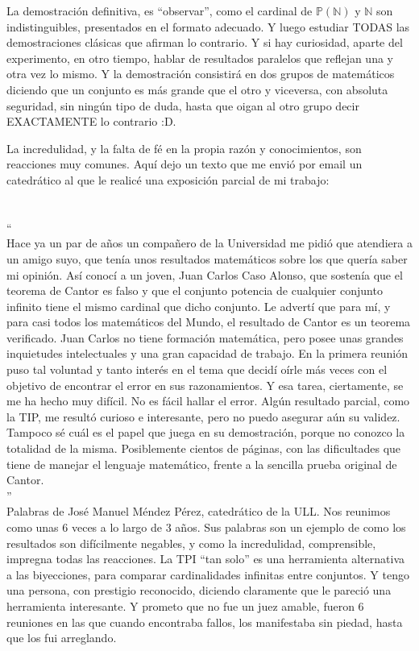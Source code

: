 \noindent
La demostración definitiva, es ``observar'', como el cardinal de $\mathbb{P(N)}$ y $\mathbb{N}$ son indistinguibles, presentados en el formato adecuado. Y luego estudiar TODAS las demostraciones clásicas que afirman lo contrario. Y si hay curiosidad, aparte del experimento, en otro tiempo, hablar de resultados paralelos que reflejan una y otra vez lo mismo. Y la demostración consistirá en dos grupos de matemáticos diciendo que un conjunto es más grande que el otro y viceversa, con absoluta seguridad, sin ningún tipo de duda, hasta que oigan al otro grupo decir EXACTAMENTE lo contrario :D.

\noindent
La incredulidad, y la falta de fé en la propia razón y conocimientos, son reacciones muy comunes. Aquí dejo un texto que me envió por email un catedrático al que le realicé una exposición parcial de mi trabajo:\\\\
\\
``\\
Hace ya un par de años un compañero de la Universidad me pidió que atendiera a un amigo suyo, 
que tenía unos resultados matemáticos sobre los que quería saber mi opinión. Así conocí a un 
joven, Juan Carlos Caso Alonso, que sostenía que el teorema de Cantor es falso y que el conjunto 
potencia de cualquier conjunto infinito tiene el mismo cardinal que dicho conjunto. Le advertí que 
para mí, y para casi todos los matemáticos del Mundo, el resultado de Cantor es un teorema verificado.
Juan Carlos no tiene formación matemática, pero posee unas grandes inquietudes intelectuales y una 
gran capacidad de trabajo. En la primera reunión puso tal voluntad y tanto interés en el tema que 
decidí oírle más veces con el objetivo de encontrar el error en sus razonamientos. Y esa tarea, 
ciertamente, se me ha hecho muy difícil. No es fácil hallar el error. Algún resultado parcial, como la 
TIP, me resultó curioso e interesante, pero no puedo asegurar aún su validez. Tampoco sé cuál es 
el papel que juega en su demostración, porque no conozco la totalidad de la misma. Posiblemente 
cientos de páginas, con las dificultades que tiene de manejar el lenguaje matemático, frente a la 
sencilla prueba original de Cantor.\\
''\\
Palabras de José Manuel Méndez Pérez, catedrático de la ULL. Nos reunimos como unas 6 veces a lo largo de 3 años. Sus palabras son un ejemplo de como los resultados son difícilmente negables, y como la incredulidad, comprensible, impregna todas las reacciones. La TPI ``tan solo'' es una herramienta alternativa a las biyecciones, para comparar cardinalidades infinitas entre conjuntos. Y tengo una persona, con prestigio reconocido, diciendo claramente que le pareció una herramienta interesante. Y prometo que no fue un juez amable, fueron 6 reuniones en las que cuando encontraba fallos, los manifestaba sin piedad, hasta que los fui arreglando.

